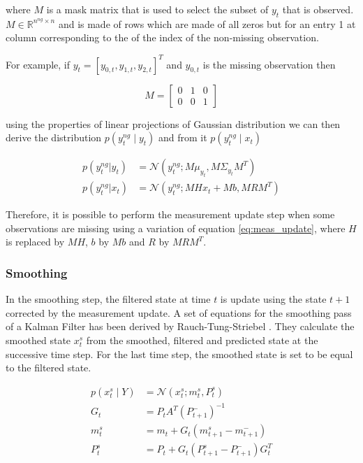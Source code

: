 \documentclass{article}
\newcommand{\norm}[3]{\mathcal{N}\left(#1; #2, #3\right)} %
\begin{document}
where $M$ is a mask matrix that is used to select the subset of $y_t$ that is observed. $M \in \mathbb{R}^{n^{ng} \times n}$ and is made of rows which are made of all zeros but for an entry 1 at column corresponding to the of the index of the non-missing observation.

For example, if $y_t = [y_{0,t}, y_{1,t}, y_{2,t}]^T$ and $y_{0,t}$ is the missing observation then

\begin{equation}
 M = \left[\begin{array}{ccc}
    0 & 1 & 0 \\
    0 & 0 & 1
\end{array}\right]
\end{equation}

 using the properties of linear projections of Gaussian distribution we can then derive the distribution $p(y^{ng}_t \mid y_t)$ and from it $p(y^{ng}_t \mid x_t)$ 

\begin{align}
   p(y^{ng}_t|y_t) &= \norm{y^{ng}_t}{M\mu_{y_t}}{M\Sigma_{y_t}M^T} \label{eq:partial_obs}\\
  p(y^{ng}_t|x_t) &= \norm{y^{ng}_t}{MHx_t + Mb}{MRM^T}\label{eq:partial_obs_state}
\end{align}

Therefore, it is possible to perform the measurement update step when some observations are missing using a variation of equation \ref{eq:meas_update}, where $H$ is replaced by $MH$, $b$ by $Mb$ and $R$ by $MRM^T$.

\subsubsection{Smoothing}

In the smoothing step, the filtered state at time $t$ is update using the state ${t+1}$ corrected by the measurement update. A set of equations for the smoothing pass of a Kalman Filter has been derived by Rauch-Tung-Striebel \cite{rauch_maximum_1965}. They calculate the smoothed state $x_t^s$ from the smoothed, filtered and predicted state at the successive time step.
For the last time step, the smoothed state is set to be equal to the filtered state.

\begin{align}
    p(x_t^s \mid Y) &= \norm{x_t^s}{m_t^s}{P_t^s} \label{eq:smoother}\\
    G_t &= P_tA^T(P_{t+1}^-)^{-1} \label{eq:smoother:gain}\\
    m_t^s &= m_t + G_t(m_{t+1}^s - m_{t+1}^-) \label{eq:smoother:mean}\\
    P_t^s &= P_t + G_t(P_{t+1}^s - P_{t+1}^-)G_t^T \label{eq:smoother:cov}
\end{align}
\end{document}
